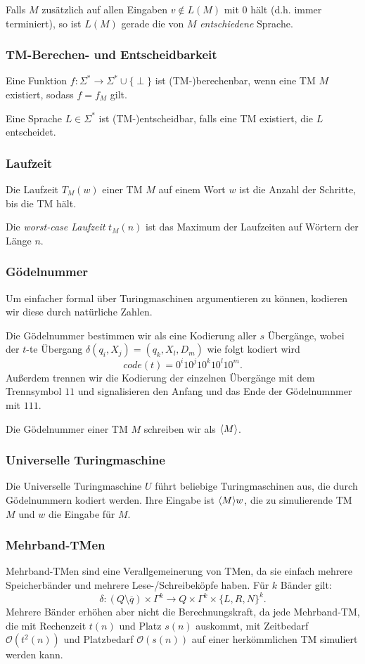 \documentclass[a4paper,parskip=half*,DIV=7,fontsize=11pt]{scrartcl}
\DeclarePairedDelimiter\goedel{\langle}{\rangle}
\begin{document}
Falls $M$ zusätzlich auf allen Eingaben $v \notin L(M)$ mit 0 hält (d.h. immer terminiert), so ist $L(M)$ gerade die von $M$ \emph{entschiedene} Sprache.

\subsubsection{TM-Berechen- und Entscheidbarkeit}
Eine Funktion $f : \Sigma^* \to \Sigma^* \cup \{\perp\}$ ist (TM-)berechenbar, wenn eine TM $M$ existiert, sodass $f = f_M$ gilt.

Eine Sprache $L \in \Sigma^*$ ist (TM-)entscheidbar, falls eine TM existiert, die $L$ entscheidet.

\subsubsection{Laufzeit}

Die Laufzeit $T_M(w)$ einer TM $M$ auf einem Wort $w$ ist die Anzahl der Schritte, bis die TM hält.

Die \emph{worst-case Laufzeit} $t_M(n)$ ist das Maximum der Laufzeiten auf Wörtern der Länge $n$.

\subsubsection{Gödelnummer}
Um einfacher formal über Turingmaschinen argumentieren zu können, kodieren wir diese durch natürliche Zahlen.

Die Gödelnummer bestimmen wir als eine Kodierung aller $s$ Übergänge, wobei der $t$-te Übergang $\delta(q_i, X_j) = (q_k, X_l, D_m)$ wie folgt kodiert wird $$code(t) = 0^i 10^j 10^k 10^l 10^m.$$ Außerdem trennen wir die Kodierung der einzelnen Übergänge mit dem Trennsymbol $11$ und signalisieren den Anfang und das Ende der Gödelnumnmer mit $111$.

Die Gödelnummer einer TM $M$ schreiben wir als $\goedel{M}$.

\subsubsection{Universelle Turingmaschine}
Die Universelle Turingmaschine $U$ führt beliebige Turingmaschinen aus, die durch Gödelnummern kodiert werden. Ihre Eingabe ist $\goedel{M} w$, die zu simulierende TM $M$ und $w$ die Eingabe für $M$.

\subsubsection{Mehrband-TMen}
Mehrband-TMen sind eine Verallgemeinerung von TMen, da sie einfach mehrere Speicherbänder und mehrere Lese-/Schreibeköpfe haben. Für $k$ Bänder gilt: 
\[\delta : (Q \setminus \overline{q}) \times \Gamma^k \to Q \times \Gamma^k \times \{L,R,N\}^k.\]
Mehrere Bänder erhöhen aber nicht die Berechnungskraft, da jede Mehrband-TM, die mit Rechenzeit $t(n)$ und Platz $s(n)$ auskommt, mit Zeitbedarf $\mathcal{O}(t^2(n))$ und Platzbedarf $\mathcal{O}(s(n))$ auf einer herkömmlichen TM simuliert werden kann. 
\end{document}
